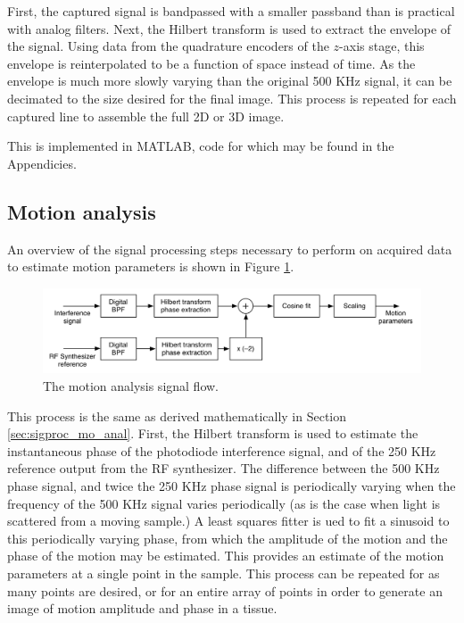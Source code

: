 First, the captured signal is bandpassed with a smaller passband than is practical with analog filters. Next, the Hilbert transform is used to extract the envelope of the signal. Using data from the quadrature encoders of the $z$-axis stage, this envelope is reinterpolated to be a function of space instead of time. As the envelope is much more slowly varying than the original 500 KHz signal, it can be decimated to the size desired for the final image. This process is repeated for each captured line to assemble the full 2D or 3D image.

This is implemented in MATLAB, code for which may be found in the Appendicies.

\subsection{Motion analysis}
\label{sec:motion_analysis_2}

An overview of the signal processing steps necessary to perform on acquired data to estimate motion parameters is shown in Figure \ref{fig:motion_analysis_block_diagram}.

\begin{figure}[h!]
\centering
\includegraphics[width=1.0\textwidth]{Images/Background/motion_process.png}
\caption{The motion analysis signal flow. \label{fig:motion_analysis_block_diagram}}
\end{figure}

This process is the same as derived mathematically in Section \ref{sec:sigproc_mo_anal}. First, the Hilbert transform is used to estimate the instantaneous phase of the photodiode interference signal, and of the 250 KHz reference output from the RF synthesizer. The difference between the 500 KHz phase signal, and twice the 250 KHz phase signal is periodically varying when the frequency of the 500 KHz signal varies periodically (as is the case when light is scattered from a moving sample.) A least squares fitter is ued to fit a sinusoid to this periodically varying phase, from which the amplitude of the motion and the phase of the motion may be estimated. This provides an estimate of the motion parameters at a single point in the sample. This process can be repeated for as many points are desired, or for an entire array of points in order to generate an image of motion amplitude and phase in a tissue.

